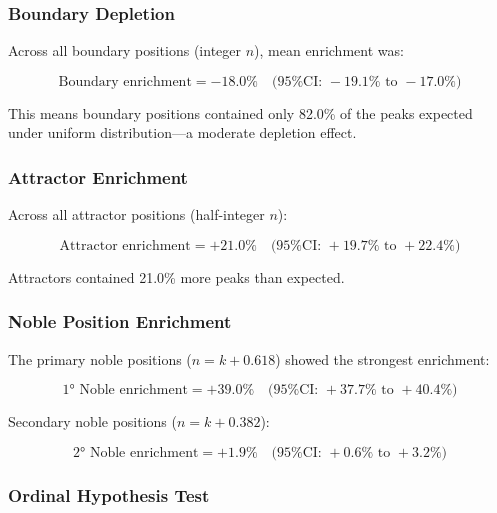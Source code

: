 \documentclass[11pt,a4paper]{article}
\begin{document}
\subsubsection{Boundary Depletion}

Across all boundary positions (integer $n$), mean enrichment was:

\begin{equation}
\text{Boundary enrichment} = -18.0\% \quad \text{(95\% CI: } -19.1\% \text{ to } -17.0\%)
\end{equation}

This means boundary positions contained only 82.0\% of the peaks expected under uniform distribution---a moderate depletion effect.

\subsubsection{Attractor Enrichment}

Across all attractor positions (half-integer $n$):

\begin{equation}
\text{Attractor enrichment} = +21.0\% \quad \text{(95\% CI: } +19.7\% \text{ to } +22.4\%)
\end{equation}

Attractors contained 21.0\% more peaks than expected.

\subsubsection{Noble Position Enrichment}

The primary noble positions ($n = k + 0.618$) showed the strongest enrichment:

\begin{equation}
\text{1° Noble enrichment} = +39.0\% \quad \text{(95\% CI: } +37.7\% \text{ to } +40.4\%)
\end{equation}

Secondary noble positions ($n = k + 0.382$):

\begin{equation}
\text{2° Noble enrichment} = +1.9\% \quad \text{(95\% CI: } +0.6\% \text{ to } +3.2\%)
\end{equation}

\subsubsection{Ordinal Hypothesis Test}
\label{sec:ordinal_test_results}
\end{document}
